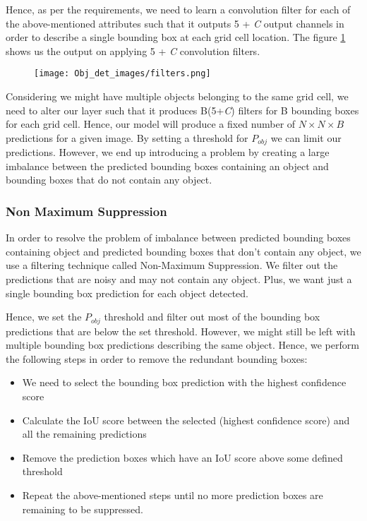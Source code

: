 Hence, as per the requirements, we need to learn a convolution filter for each of the above-mentioned attributes such that it outputs 5 + \textit{C} output channels in order to describe a single bounding box at each grid cell location. The figure \ref{fig:filters} shows us the output on applying 5 + \textit{C} convolution filters. 

\begin{figure}[h!]
    \centering
    \texttt{[image: Obj\_det\_images/filters.png]}
    \caption{\cite{JJ1}}
    \label{fig:filters}
\end{figure}

Considering we might have multiple objects belonging to the same grid cell, we need to alter our layer such that it produces B(5+\textit{C}) filters for B bounding boxes for each grid cell. Hence, our model will produce a fixed number of $N\times N\times B$ predictions for a given image. By setting a threshold for \textit{$P_{obj}$} we can limit our predictions. However, we end up introducing a problem by creating a large imbalance between the predicted bounding boxes containing an object and bounding boxes that do not contain any object.
  

\subsubsection{Non Maximum Suppression}

In order to resolve the problem of imbalance between predicted bounding boxes containing object and predicted bounding boxes that don't contain any object, we use a filtering technique called Non-Maximum Suppression. We filter out the predictions that are noisy and may not contain any object. Plus, we want just a single bounding box prediction for each object detected. 
\par
Hence, we set the \textit{$P_{obj}$} threshold and filter out most of the bounding box predictions that are below the set threshold. However, we might still be left with multiple bounding box predictions describing the same object. Hence, we perform the following steps in order to remove the redundant bounding boxes:

\begin{itemize}
    \item We need to select the bounding box prediction with the highest confidence score
    \item Calculate the IoU score between the selected (highest confidence score) and all the remaining predictions
    \item Remove the prediction boxes which have an IoU score above some defined threshold
    \item Repeat the above-mentioned steps until no more prediction boxes are remaining to be suppressed. 
\end{itemize}

